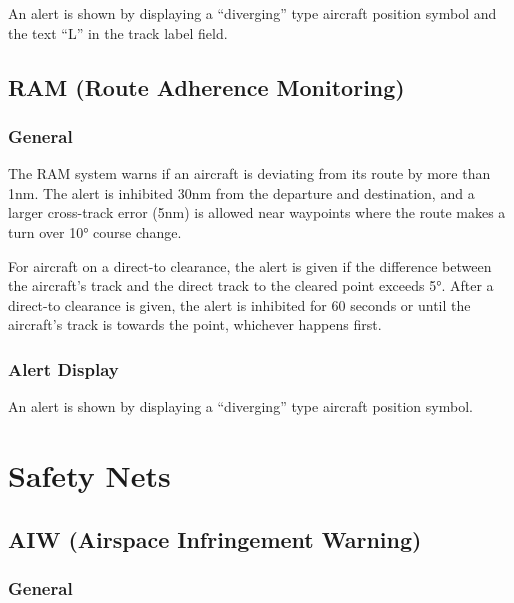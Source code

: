 \documentclass[a4paper,oneside,11pt]{memoir}
\begin{document}
An alert is shown by displaying a “diverging” type aircraft position symbol and the text “L” in the  track label field.

\subsection{RAM (Route Adherence Monitoring)}
\label{tool:RAM}
\subsubsection*{General}

The RAM system warns if an aircraft is deviating from its route by more than 1nm. The alert is inhibited 30nm from the departure and destination, and a larger cross-track error (5nm) is allowed near waypoints where the route makes a turn over 10° course change.

\bigskip

For aircraft on a direct-to clearance, the alert is given if the difference between the aircraft’s track and the direct track to the cleared point exceeds 5°. After a direct-to clearance is given, the alert is inhibited for 60 seconds or until the aircraft’s track is towards the point, whichever happens first.

\subsubsection*{Alert Display}

An alert is shown by displaying a “diverging” type aircraft position symbol.

\section{Safety Nets}



\subsection{AIW (Airspace Infringement Warning)}
\label{tool:AIW}
\subsubsection*{General}
\end{document}

